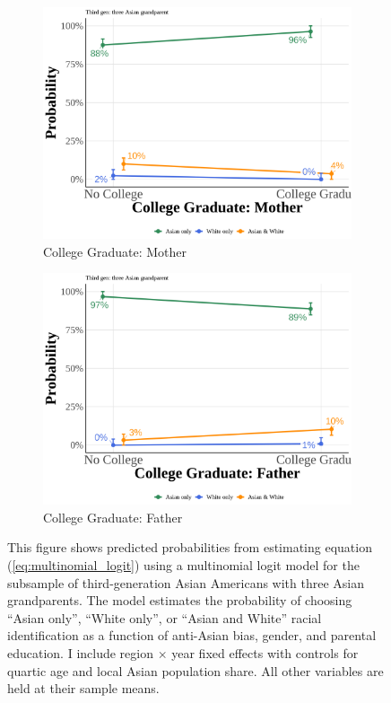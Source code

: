 \begin{center}
\begin{figure}[!htb]
\vspace{0.5cm}

\begin{subfigure}{.48\textwidth}
\caption{College Graduate: Mother}
\centering
\includegraphics[width=1\linewidth]{simple_pp_MomGradCollege_third_three.png}
\end{subfigure}
\hfill
\begin{subfigure}{.48\textwidth}
\caption{College Graduate: Father}
\centering
\includegraphics[width=1\linewidth]{simple_pp_DadGradCollege_third_three.png}
\end{subfigure}

\caption*{\footnotesize{This figure shows predicted probabilities from estimating equation (\ref{eq:multinomial_logit}) using a multinomial logit model for the subsample of third-generation Asian Americans with three Asian grandparents. The model estimates the probability of choosing ``Asian only'', ``White only'', or ``Asian and White'' racial identification as a function of anti-Asian bias, gender, and parental education. I include region $\times$ year fixed effects with controls for quartic age and local Asian population share. All other variables are held at their sample means.}}
\end{figure}
\end{center}

